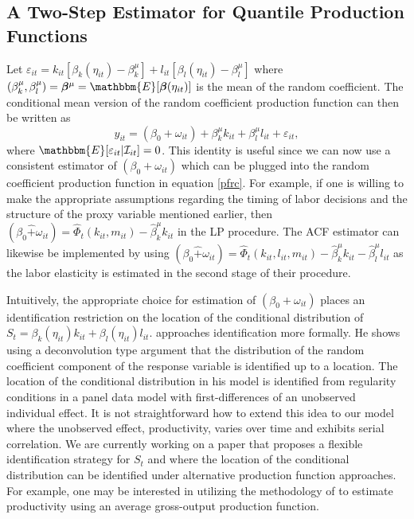 \documentclass[11pt]{article}
\begin{document}
\subsection{A Two-Step Estimator for Quantile Production Functions}
Let $\varepsilon_{it}=k_{it}[\beta_{k}(\eta_{it})-\beta^{\mu}_{k}]+l_{it}[\beta_{l}(\eta_{it})-\beta^{\mu}_{l}]$ where $(\beta_{k}^{\mu}, \beta_{l}^{\mu})=\boldsymbol{\beta}^{\mu}=\mathbbm{E}[\boldsymbol{\beta}(\eta_{it})]$ is the mean of the random coefficient. The conditional mean version of the random coefficient production function can then be written as
\begin{equation}
y_{it}=(\beta_{0}+\omega_{it})+\beta_{k}^{\mu}k_{it}+\beta_{l}^{\mu}l_{it}+\varepsilon_{it},
\end{equation}
where $\mathbbm{E}[\varepsilon_{it}|\mathcal{I}_{it}]=0$. This identity is useful since we can now use a consistent estimator of $(\beta_{0}+\omega_{it})$ which can be plugged into the random coefficient production function in equation \eqref{pfrc}. For example, if one is willing to make the appropriate assumptions regarding the timing of labor decisions and the structure of the proxy variable mentioned earlier, then $(\beta_{0}\hat{+}\omega_{it})=\hat{\Phi}_{t}(k_{it}, m_{it})-\hat{\beta}_{k}^{\mu}k_{it}$ in the LP procedure. The ACF estimator can likewise be implemented by using  $(\beta_{0}\hat{+}\omega_{it})=\hat{\Phi}_{t}(k_{it}, l_{it}, m_{it})-\hat{\beta}_{k}^{\mu}k_{it}-\hat{\beta}_{l}^{\mu}l_{it}$ as the labor elasticity is estimated in the second stage of their procedure.

Intuitively, the appropriate choice for estimation of $(\beta_{0}+\omega_{it})$ places an identification restriction on the location of the conditional distribution of $S_{t}=\beta_{k}(\eta_{it})k_{it}+\beta_{l}(\eta_{it})l_{it}$. \cite{Canay2011} approaches identification more formally. He shows using a deconvolution type argument that the distribution of the random coefficient component of the response variable is identified up to a location. The location of the conditional distribution in his model is identified from regularity conditions in a panel data model with first-differences of an unobserved individual effect. It is not straightforward how to extend this idea to our model where the unobserved effect, productivity, varies over time and exhibits serial correlation. We are currently working on a paper that proposes a flexible identification strategy for $S_{t}$ and where the location of the conditional distribution can be identified under alternative production function approaches. For example, one may be interested in utilizing the methodology of \cite{Gandhi2020} to estimate productivity using an average gross-output production function. 
\end{document}
